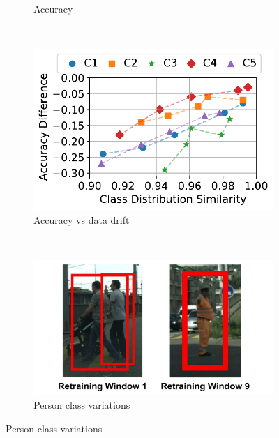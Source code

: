 \begin{figure}[t!]
\begin{subfigure}[t]{0.42\linewidth}
    
    \caption{Accuracy}
    \label{fig:jena-motivation}
  \end{subfigure}
    \hspace*{\fill}
  ~~
  \begin{subfigure}[t]{0.41\linewidth}
    \centering
    \includegraphics[width=\linewidth]{ekya/figures/motivation/incr_learn_motivation/motivation_datadrift_vs_acc.pdf}
     \caption{Accuracy vs data drift}
    \label{fig:acc-datadrift}
  \end{subfigure}
  ~~
  \begin{subfigure}[t]{0.41\linewidth}
    \centering
    \includegraphics[width=\linewidth]{ekya/figures/motivation/incr_learn_motivation/person_classshift.pdf}
    \caption{Person class variations}
    \label{fig:personclass}
  \end{subfigure}
  

\end{figure}
